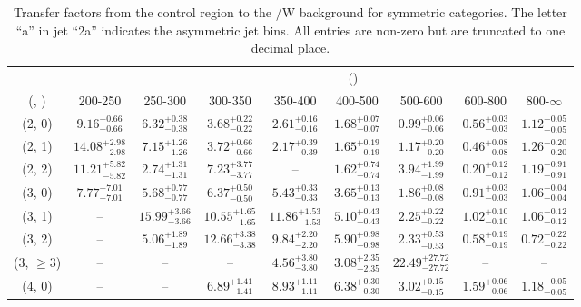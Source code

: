 \begin{table}[h!]
\tiny
\centering
\caption{Transfer factors from the \mmj control region to the \ttbar/W background for symmetric categories. The letter ``a'' in jet \eg ``2a''  indicates the asymmetric jet bins. All entries are non-zero but are truncated to one decimal place.\label{tab:tf_mumu_ttw_sym}}
\begin{tabular}
{ccccccccc}
	\hline\hline
&	& \multicolumn{8}{c}{\scalht (\gev)} \\ 
	 (\njet,  \nb) & 200-250 & 250-300 & 300-350 & 350-400 & 400-500 & 500-600 & 600-800 & 800-$\infty$ \\ [0.8ex] 
\hline
	(2, 0) & $9.16^{+ 0.66 }_{- 0.66 }$ & $6.32^{+ 0.38 }_{- 0.38 }$ & $3.68^{+ 0.22 }_{- 0.22 }$ & $2.61^{+ 0.16 }_{- 0.16 }$ & $1.68^{+ 0.07 }_{- 0.07 }$ & $0.99^{+ 0.06 }_{- 0.06 }$ & $0.56^{+ 0.03 }_{- 0.03 }$ & $1.12^{+ 0.05 }_{- 0.05 }$ \\[0.5ex] 
	(2, 1) & $14.08^{+ 2.98 }_{- 2.98 }$ & $7.15^{+ 1.26 }_{- 1.26 }$ & $3.72^{+ 0.66 }_{- 0.66 }$ & $2.17^{+ 0.39 }_{- 0.39 }$ & $1.65^{+ 0.19 }_{- 0.19 }$ & $1.17^{+ 0.20 }_{- 0.20 }$ & $0.46^{+ 0.08 }_{- 0.08 }$ & $1.26^{+ 0.20 }_{- 0.20 }$ \\[0.5ex] 
	(2, 2) & $11.21^{+ 5.82 }_{- 5.82 }$ & $2.74^{+ 1.31 }_{- 1.31 }$ & $7.23^{+ 3.77 }_{- 3.77 }$ & -- & $1.62^{+ 0.74 }_{- 0.74 }$ & $3.94^{+ 1.99 }_{- 1.99 }$ & $0.20^{+ 0.12 }_{- 0.12 }$ & $1.19^{+ 0.91 }_{- 0.91 }$ \\[0.5ex] 
	(3, 0) & $7.77^{+ 7.01 }_{- 7.01 }$ & $5.68^{+ 0.77 }_{- 0.77 }$ & $6.37^{+ 0.50 }_{- 0.50 }$ & $5.43^{+ 0.33 }_{- 0.33 }$ & $3.65^{+ 0.13 }_{- 0.13 }$ & $1.86^{+ 0.08 }_{- 0.08 }$ & $0.91^{+ 0.03 }_{- 0.03 }$ & $1.06^{+ 0.04 }_{- 0.04 }$ \\[0.5ex] 
	(3, 1) & -- & $15.99^{+ 3.66 }_{- 3.66 }$ & $10.55^{+ 1.65 }_{- 1.65 }$ & $11.86^{+ 1.53 }_{- 1.53 }$ & $5.10^{+ 0.43 }_{- 0.43 }$ & $2.25^{+ 0.22 }_{- 0.22 }$ & $1.02^{+ 0.10 }_{- 0.10 }$ & $1.06^{+ 0.12 }_{- 0.12 }$ \\[0.5ex] 
	(3, 2) & -- & $5.06^{+ 1.89 }_{- 1.89 }$ & $12.66^{+ 3.38 }_{- 3.38 }$ & $9.84^{+ 2.20 }_{- 2.20 }$ & $5.90^{+ 0.98 }_{- 0.98 }$ & $2.33^{+ 0.53 }_{- 0.53 }$ & $0.58^{+ 0.19 }_{- 0.19 }$ & $0.72^{+ 0.22 }_{- 0.22 }$ \\[0.5ex] 
	(3, $\ge3$) & -- & -- & -- & $4.56^{+ 3.80 }_{- 3.80 }$ & $3.08^{+ 2.35 }_{- 2.35 }$ & $22.49^{+ 27.72 }_{- 27.72 }$ & -- & -- \\[0.5ex] 
	(4, 0) & -- & -- & $6.89^{+ 1.41 }_{- 1.41 }$ & $8.93^{+ 1.11 }_{- 1.11 }$ & $6.38^{+ 0.30 }_{- 0.30 }$ & $3.02^{+ 0.15 }_{- 0.15 }$ & $1.59^{+ 0.06 }_{- 0.06 }$ & $1.18^{+ 0.05 }_{- 0.05 }$ \\[0.5ex] 

\end{tabular}
\end{table}
